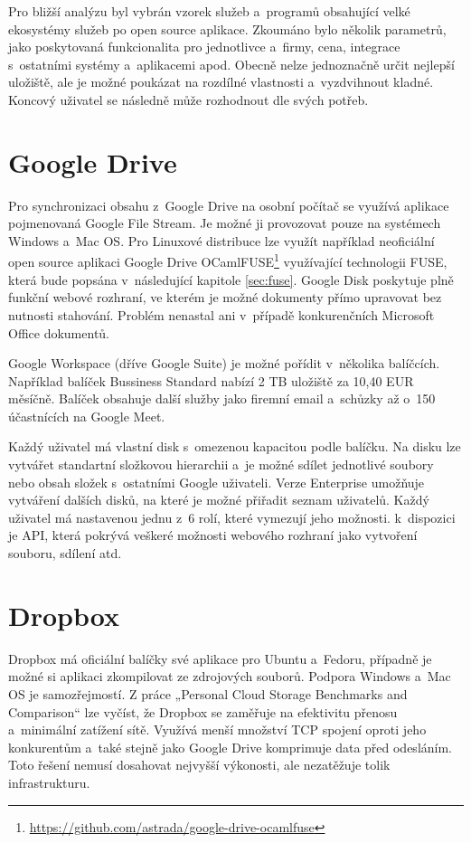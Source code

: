 Pro bližší analýzu byl vybrán vzorek služeb a programů obsahující velké ekosystémy služeb po open source aplikace. Zkoumáno bylo několik parametrů,
jako poskytovaná funkcionalita pro jednotlivce a firmy, cena, integrace s ostatními systémy a aplikacemi apod. Obecně nelze jednoznačně určit nejlepší uložiště, 
ale je možné poukázat na rozdílné vlastnosti a vyzdvihnout kladné. Koncový uživatel se následně může rozhodnout dle svých potřeb.

\section{Google Drive}

Pro synchronizaci obsahu z Google Drive na osobní počítač se využívá aplikace pojmenovaná Google File Stream. Je možné ji provozovat pouze na systémech
Windows a Mac OS. \cite{GoogleFileStream} Pro Linuxové distribuce lze využít například neoficiální open source aplikaci 
Google Drive OCamlFUSE\footnote{\url{https://github.com/astrada/google-drive-ocamlfuse}} využívající technologii
FUSE, která bude popsána v následující kapitole \ref{sec:fuse}. Google Disk poskytuje plně funkční webové rozhraní,
ve kterém je možné dokumenty přímo upravovat bez nutnosti stahování. Problém nenastal ani v případě konkurenčních Microsoft Office dokumentů. 

Google Workspace (dříve Google Suite) je možné pořídit v několika balíčcích. Například balíček Bussiness Standard nabízí 2 TB uložiště za 10,40 EUR měsíčně.
Balíček obsahuje další služby jako firemní email a schůzky až o 150 účastnících na Google Meet. \cite{GoogleWorkspace}

Každý uživatel má vlastní disk s omezenou kapacitou podle balíčku. Na disku lze vytvářet standartní složkovou hierarchii a je možné sdílet jednotlivé soubory nebo
obsah složek s ostatními Google uživateli. Verze Enterprise umožňuje vytváření dalších disků, na které je možné přiřadit seznam uživatelů. Každý uživatel
má nastavenou jednu z 6 rolí, které vymezují jeho možnosti. k dispozici je API, která pokrývá veškeré možnosti webového rozhraní jako vytvoření souboru,
sdílení atd. \cite{GoogleAPIReference}

\section{Dropbox}

Dropbox má oficiální balíčky své aplikace pro Ubuntu a Fedoru, případně je možné si aplikaci zkompilovat ze zdrojových souborů. Podpora Windows a Mac OS je samozřejmostí.
Z práce „Personal Cloud Storage Benchmarks and Comparison“ lze vyčíst, že Dropbox se zaměřuje na efektivitu přenosu a minimální zatížení sítě.
Využívá menší množství TCP spojení oproti jeho konkurentům a také stejně jako Google Drive komprimuje data před odesláním. \cite{CloudStorageComparison}
Toto řešení nemusí dosahovat nejvyšší výkonosti, ale nezatěžuje tolik infrastrukturu. 

